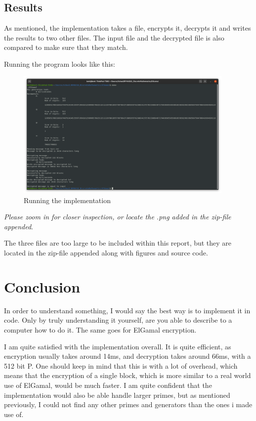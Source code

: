 \documentclass{article}
\begin{document}
\subsection{Results}

As mentioned, the implementation takes a file, encrypts it, decrypts it and writes the results to two other files. The input file and the decrypted file is also compared to make sure that they match.

Running the program looks like this:

\begin{figure}[H]
 \centering
  \includegraphics[width=300pt]{img/make.png}
 \caption{Running the implementation}
 \label{MAKE}
 \end{figure}
\textit{Please zoom in for closer inspection, or locate the .png added in the zip-file appended}.


The three files are too large to be included within this report, but they are located in the zip-file appended along with figures and source code.

\section{Conclusion}
In order to understand something, I would say the best way is to implement it in code. Only by truly understanding it yourself, are you able to describe to a computer how to do it. The same goes for ElGamal encryption.

I am quite satisfied with the implementation overall. It is quite efficient, as encryption usually takes around 14ms, and decryption takes around 66ms, with a 512 bit P. One should keep in mind that this is with a lot of overhead, which means that the encryption of a single block, which is more similar to a real world use of ElGamal, would be much faster. I am quite confident that the implementation would also be able handle larger primes, but as mentioned previously, I could not find any other primes and generators than the ones i made use of.
\end{document}
